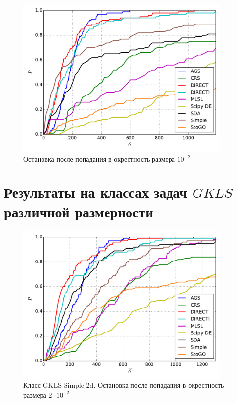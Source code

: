 \documentclass[a4paper]{article}
\begin{document}
\begin{figure}[H]
  \center
  \includegraphics[width=0.95\textwidth]{../experiments/grish/cmc.pdf}
  \caption{Остановка после попадания в окрестность размера $10^{-2}$}
  \label{fig:}
\end{figure}


\section{Результаты на классах задач $GKLS$ различной размерности}

\begin{figure}[H]
  \center
  \includegraphics[width=0.95\textwidth]{../experiments/gklss2d/cmc.pdf}
  \caption{Класс GKLS Simple 2d. Остановка после попадания в окрестность размера $2\cdot10^{-2}$}
  \label{fig:}
\end{figure}
\end{document}
